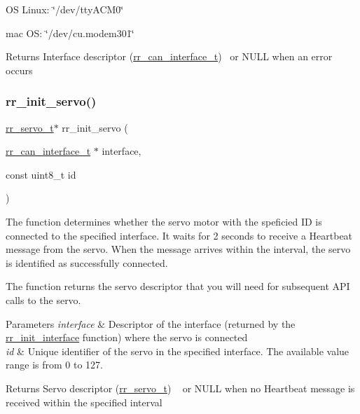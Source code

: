 OS Linux\+: \char`\"{}/dev/tty\+A\+C\+M0\char`\"{}

mac OS\+: \char`\"{}/dev/cu.\+modem301\char`\"{}

\begin{DoxyReturn}{Returns}
Interface descriptor (\hyperlink{structrr__can__interface__t}{rr\+\_\+can\+\_\+interface\+\_\+t})~\newline
 or N\+U\+LL when an error occurs 
\end{DoxyReturn}
\mbox{\label{group___common_ga0adb313a3eeb8a4399431e940a1f3e9e}} 
\subsubsection{\texorpdfstring{rr\+\_\+init\+\_\+servo()}{rr\_init\_servo()}}
{\footnotesize\ttfamily \hyperlink{structrr__servo__t}{rr\+\_\+servo\+\_\+t}$\ast$ rr\+\_\+init\+\_\+servo (\begin{DoxyParamCaption}\item[{\hyperlink{structrr__can__interface__t}{rr\+\_\+can\+\_\+interface\+\_\+t} $\ast$}]{interface,  }\item[{const uint8\+\_\+t}]{id }\end{DoxyParamCaption})}



The function determines whether the servo motor with the speficied ID is connected to the specified interface. It waits for 2 seconds to receive a Heartbeat message from the servo. When the message arrives within the interval, the servo is identified as successfully connected.~\newline
 

The function returns the servo descriptor that you will need for subsequent A\+PI calls to the servo.


\begin{DoxyParams}{Parameters}
{\em interface} & Descriptor of the interface (returned by the \hyperlink{group___common_ga472a4890dcc7d7a13123c56a06946d91}{rr\+\_\+init\+\_\+interface} function) where the servo is connected \\
\hline
{\em id} & Unique identifier of the servo in the specified interface. The available value range is from 0 to 127. \\
\hline
\end{DoxyParams}
\begin{DoxyReturn}{Returns}
Servo descriptor (\hyperlink{structrr__servo__t}{rr\+\_\+servo\+\_\+t}) ~\newline
 or N\+U\+LL when no Heartbeat message is received within the specified interval 
\end{DoxyReturn}
